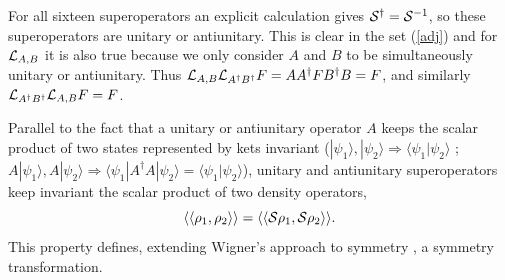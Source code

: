 {For all sixteen superoperators an explicit calculation gives  ${\cal{S}}^{\dagger}={\cal{S}}^{-1}$, so these superoperators are  unitary or antiunitary. This is clear in the set (\ref{adj}) and  for ${\cal{L}}_{A,B}$ it  is also true because we only consider $A$ and $B$ to be simultaneously unitary or antiunitary. Thus  ${\cal{L}}_{A,B}{\cal{L}}_{A^{\dagger}B^{\dagger}}F=AA^{\dagger}FB^{\dagger}B=F$,
and similarly ${\cal{L}}_{A^{\dagger}B^{\dagger}}{\cal{L}}_{A,B}F=F$.


Parallel to the fact that a unitary or antiunitary operator $A$ keeps the scalar product of two states represented by kets invariant ($|\psi_{1}\rangle,|\psi_{2}\rangle \Rightarrow \langle\psi_{1}|\psi_{2}\rangle$ ; $A|\psi_{1}\rangle,A|\psi_{2}\rangle \Rightarrow \langle\psi_{1}|A^{\dagger}A|\psi_{2}\rangle=\langle\psi_{1}|\psi_{2}\rangle$), unitary and antiunitary superoperators keep  invariant the scalar product of two density operators,
%
\begin{equation}
\langle\langle \rho_{1},\rho_{2}\rangle\rangle=\langle\langle {\cal{S}}\rho_{1},{\cal{S}}\rho_{2} \rangle\rangle.
\end{equation}
%
This property defines, extending Wigner's approach to symmetry \cite{Zee2016}, a symmetry transformation.







}
